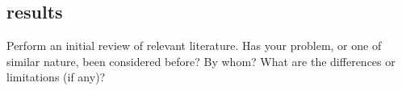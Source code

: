 \documentclass{article}
\begin{document}
















\subsection{results}
Perform an initial review of relevant literature. Has your problem, or one of similar nature, been considered before? By whom? What are the differences or limitations (if any)?
\end{document}
